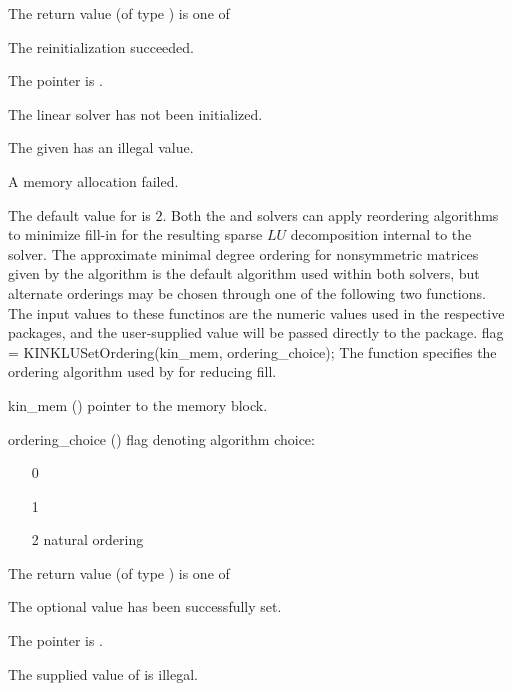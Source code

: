{
  The return value  (of type ) is one of
  \begin{args}
  \item[\Id{KINSLS\_SUCCESS}] 
    The reinitialization succeeded.
  \item[\Id{KINSLS\_MEM\_NULL}]
    The  pointer is .
  \item[\Id{KINSLS\_LMEM\_NULL}]
    The {\kinklu} linear solver has not been initialized.
  \item[\Id{KINSLS\_ILL\_INPUT}]
    The given  has an illegal value.
  \item[\Id{KINSLS\_MEM\_FAIL}]
    A memory allocation failed.
  \end{args}
}
{
  The default value for  is $2$.
}
Both the {\kinklu} and {\kinsuperlumt} solvers can apply reordering
algorithms to minimize fill-in for the resulting sparse $LU$
decomposition internal to the solver.  The approximate minimal degree
ordering for nonsymmetric matrices given by the  algorithm
is the default algorithm used within both solvers, but alternate
orderings may be chosen through one of the following two functions.
The input values to these functinos are the numeric values used in the respective
packages, and the user-supplied value will be passed directly to the package.
{
  flag = KINKLUSetOrdering(kin\_mem, ordering\_choice);
}
{
  The function  specifies the ordering algorithm
  used by {\kinklu} for reducing fill.
}
{
  \begin{args}
  \item[kin\_mem] ()
    pointer to the {\kinsol} memory block.
  \item[ordering\_choice] ()
    flag denoting algorithm choice:
    \begin{itemize}
    \item[0] 
    \item[1] 
    \item[2] natural ordering
    \end{itemize}
  \end{args}
}
{
  The return value  (of type ) is one of
  \begin{args}
  \item[\Id{KINSLS\_SUCCESS}] 
    The optional value has been successfully set.
  \item[\Id{KINSLS\_MEM\_NULL}]
    The  pointer is .
  \item[\Id{KINSLS\_ILL\_INPUT}]
    The supplied value of  is illegal.
  \end{args}
}
